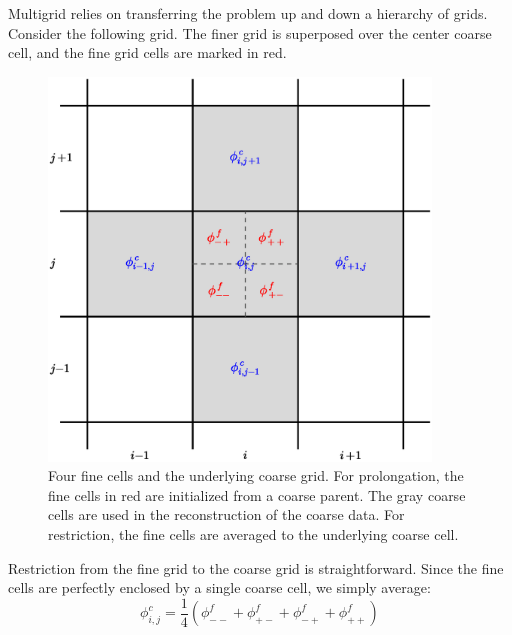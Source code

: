 Multigrid relies on transferring the problem up and down a hierarchy of
grids.  Consider the following grid.  The finer grid is superposed over
the center coarse cell, and the fine grid cells are marked in red.

\begin{figure}[h]
\centering
\includegraphics[width=4.0in]{2dgrid-prolong}
\caption[The geometry for 2-d
  prolongation]{\label{fig:2dgrid-prolong} Four fine cells and the
  underlying coarse grid.  For prolongation, the fine cells in red are
  initialized from a coarse parent.  The gray coarse cells are used in
  the reconstruction of the coarse data.  For restriction, the fine
  cells are averaged to the underlying coarse cell.}
\end{figure}

Restriction from the fine grid to the coarse grid is straightforward.
Since the fine cells are perfectly enclosed by a single coarse cell,
we simply average:
\begin{equation}
\phi_{i,j}^c = \frac{1}{4} ( \phi_{--}^f + \phi_{+-}^f +
                             \phi_{-+}^f + \phi_{++}^f )
\end{equation}

